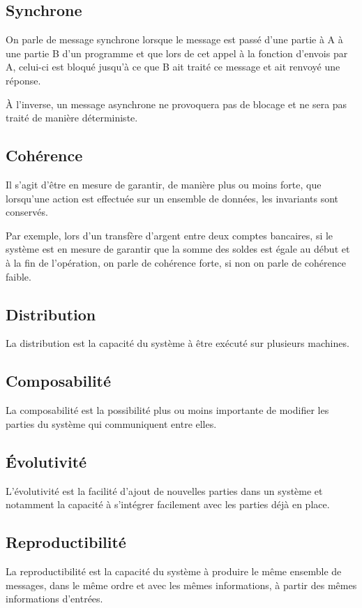 \documentclass{article}
\begin{document}
\subsection{Synchrone}
On parle de message synchrone lorsque le message est passé d'une partie à A à une
partie B d'un programme et que lors de cet appel à la fonction d'envois par A, celui-ci
est bloqué jusqu'à ce que B ait traité ce message et ait renvoyé une réponse.

À l'inverse, un message asynchrone ne provoquera pas de blocage et ne sera pas
traité de manière déterministe.

\subsection{Cohérence}
Il s'agit d'être en mesure de garantir, de manière plus ou moins forte, que lorsqu'une
action est effectuée sur un ensemble de données, les invariants sont conservés.

Par exemple, lors d'un transfère d'argent entre deux comptes bancaires, si le système
est en mesure de garantir que la somme des soldes est égale au début et à la fin
de l'opération, on parle de cohérence forte, si non on parle de cohérence faible.

\subsection{Distribution}
La distribution est la capacité du système à être exécuté sur plusieurs machines.

\subsection{Composabilité}
La composabilité est la possibilité plus ou moins importante de modifier les parties
du système qui communiquent entre elles.

\subsection{Évolutivité}
L'évolutivité est la facilité d'ajout de nouvelles parties dans un système et notamment
la capacité à s'intégrer facilement avec les parties déjà en place.

\subsection{Reproductibilité}
La reproductibilité est la capacité du système à produire le même ensemble de messages,
dans le même ordre et avec les mêmes informations, à partir des mêmes informations d'entrées.
\end{document}
